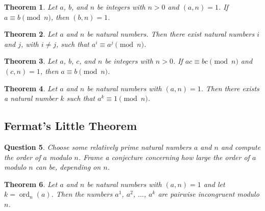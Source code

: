 \documentclass[11pt,leqno]{article}
\newtheorem{thm}{Theorem}[section]
\newtheorem{ques}[thm]{Question}
\theoremstyle{definition}
\newcommand{\ord}{\operatorname{ord}}
\begin{document}
\begin{thm}
Let $a$, $b$, and $n$ be integers with $n>0$ and $(a, n) = 1$.  If
$a\equiv b \pmod{n}$, then $(b, n) = 1$.
\end{thm}


\begin{thm}
Let $a$ and $n$ be natural numbers.  Then there exist natural
numbers $i$ and $j$, with $i \neq j$, such that $a^i \equiv a^j
\pmod{n}$.
\end{thm}


\begin{thm}
Let $a$, $b$, $c$, and $n$ be integers with $n
> 0$.  If $ac \equiv bc \pmod{n}$ and $(c, n) = 1$, then $a \equiv b
\pmod{n}$.
\end{thm}


\begin{thm}
Let $a$ and $n$ be natural numbers with $(a, n) = 1$.  Then there
exists a natural number $k$ such that $a^k \equiv 1 \pmod{n}$.
\end{thm}




\subsection*{Fermat's Little Theorem}


\begin{ques}
Choose some relatively prime natural numbers $a$ and $n$ and compute
the order of $a$ modulo $n$. Frame a conjecture concerning how large
the order of $a$ modulo $n$ can be, depending on $n$.
\end{ques}


\begin{thm}
Let $a$ and $n$ be natural numbers with $(a, n) = 1$ and let $k =
\ord_n(a)$.  Then the numbers $a^1$, $a^2$, $\dots$, $a^k$ are
pairwise incongruent modulo $n$.
\end{thm}
\end{document}
